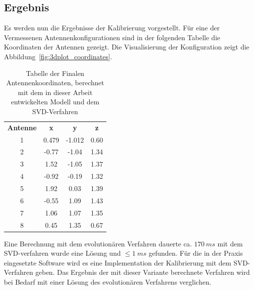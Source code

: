 \subsection{Ergebnis}
Es werden nun die Ergebnisse der Kalibrierung vorgestellt. Für eine der Vermessenen Antennenkonfigurationen sind in der folgenden Tabelle die Koordinaten der Antennen gezeigt. Die Visualisierung der Konfiguration zeigt die Abbildung~\ref{fig:3dplot_coordinates}.
%
\begin{table} [h]
	\begin{center}
		\begin{tabular}{cccc}
		      \textbf{Antenne} & \textbf{x} & \textbf{y} & \textbf{z} \\
		      1 &	0.479	&	-1.012 & 0.60 \\
		      2 &	-0.77 	&	-1.04 & 1.34 \\
		      3 &	1.52  	&	-1.05 & 1.37 \\
		      4 &	-0.92 	&	-0.19 & 1.32 \\
		      5 &	1.92 	&	0.03 & 1.39 \\
		      6 &	-0.55 	&	1.09 & 1.43 \\
		      7 &	1.06 	&	1.07 & 1.35 \\
		      8 &	0.45 	&	1.35 & 0.67 \\
		\end{tabular}
		\caption[Finale Antennen Koordinaten]{Tabelle der Finalen Antennenkoordinaten, berechnet mit dem in dieser Arbeit entwickelten Modell und dem SVD-Verfahren}
		\label{tab:FinalCoords}
	\end{center}
\end{table}
%
Eine Berechnung mit dem evolutionären Verfahren dauerte ca. $170~ms$ mit dem SVD-verfahren wurde eine Lösung und $\le 1~ms$ gefunden. Für die in der Praxis eingesetzte Software wird es eine Implementation der Kalibrierung mit dem SVD-Verfahren geben. Das Ergebnis der mit dieser Variante berechnete Verfahren wird bei Bedarf mit einer Lösung des evolutionären Verfahrens verglichen.
%
